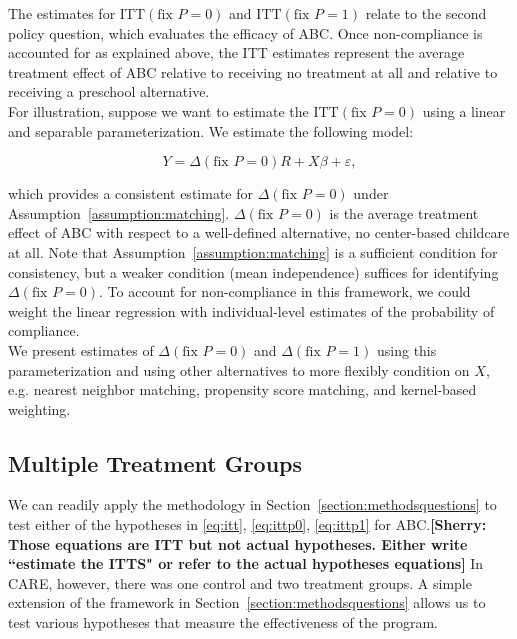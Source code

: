 \noindent The estimates for $\text{ITT} \left( \text{fix } P = 0 \right) $ and $\text{ITT} \left( \text{fix } P = 1 \right)$ relate to the second policy question, which evaluates the efficacy of ABC. Once non-compliance is accounted for as explained above, the ITT estimates represent the average treatment effect of ABC relative to receiving no treatment at all and relative to receiving a preschool alternative.\\

\noindent For illustration, suppose we want to estimate the $\text{ITT} \left( \text{fix } P = 0 \right)$ using a linear and separable parameterization. We estimate the following model: 

\begin{equation}
Y = \Delta \left( \text{fix } P = 0 \right) R + X \beta + \varepsilon, 
\end{equation}

\noindent which provides a consistent estimate for $\Delta \left( \text{fix } P = 0 \right)$ under Assumption~\ref{assumption:matching}. $\Delta \left( \text{fix } P = 0 \right)$ is the average treatment effect of ABC with respect to a well-defined alternative, no center-based childcare at all. Note that Assumption~\ref{assumption:matching} is a sufficient condition for consistency, but a weaker condition (mean independence) suffices for identifying $\Delta \left( \text{fix } P = 0 \right)$. To account for non-compliance in this framework, we could weight the linear regression with individual-level estimates of the probability of compliance.\\

\noindent We present estimates of $\Delta \left( \text{fix } P = 0 \right)$ and $\Delta \left( \text{fix } P = 1 \right)$ using this parameterization and using other alternatives to more flexibly  condition on $X$, e.g. nearest neighbor matching, propensity score matching, and kernel-based weighting.

\subsection{Multiple Treatment Groups}

\noindent We can readily apply the methodology in Section~\ref{section:methodsquestions}  to test either of the hypotheses in \eqref{eq:itt}, \eqref{eq:ittp0}, \eqref{eq:ittp1} for ABC.\textbf{[Sherry: Those equations are ITT but not actual hypotheses. Either write ``estimate the ITTS" or refer to the actual hypotheses equations]} In CARE, however, there was one control and two treatment groups. A simple extension of the framework in Section~\ref{section:methodsquestions} allows us to test various hypotheses that measure the effectiveness of the program.\\

